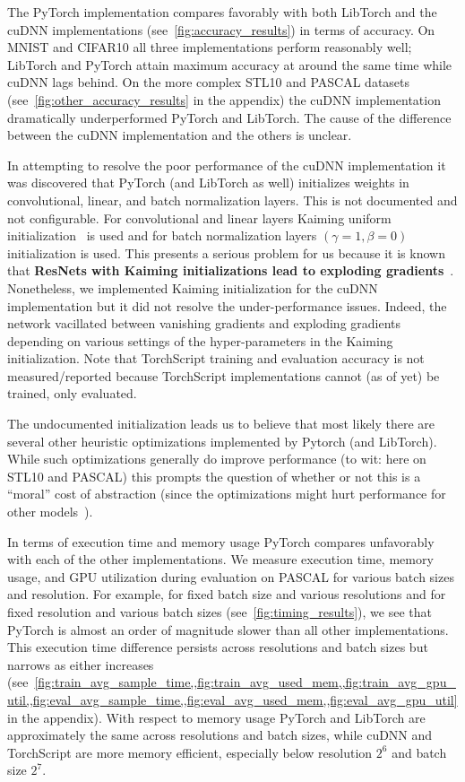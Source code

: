 

The PyTorch implementation compares favorably with both LibTorch and the cuDNN implementations (see~\cref{fig:accuracy_results}) in terms of accuracy.
On MNIST and CIFAR10 all three implementations perform reasonably well;
LibTorch and PyTorch attain maximum accuracy at around the same time while cuDNN lags behind.
On the more complex STL10 and PASCAL datasets (see~\cref{fig:other_accuracy_results} in the appendix) the cuDNN implementation dramatically underperformed PyTorch and LibTorch.
The cause of the difference between the cuDNN implementation and the others is unclear.

In attempting to resolve the poor performance of the cuDNN implementation it was discovered that PyTorch (and LibTorch as well) initializes weights in convolutional, linear, and batch normalization layers.
This is not documented and not configurable.
For convolutional and linear layers Kaiming uniform initialization~\cite{he2015delving} is used and for batch normalization layers $(\gamma=1,\beta=0)$ initialization is used.
This presents a serious problem for us because it is known that \textbf{ResNets with Kaiming initializations lead to exploding gradients}~\cite{zhang2019fixup}.
Nonetheless, we implemented Kaiming initialization for the cuDNN implementation but it did not resolve the under-performance issues.
Indeed, the network vacillated between vanishing gradients and exploding gradients depending on various settings of the hyper-parameters in the Kaiming initialization.
Note that TorchScript training and evaluation accuracy is not measured/reported because TorchScript implementations cannot (as of yet) be trained, only evaluated.

The undocumented initialization leads us to believe that most likely there are several other heuristic optimizations implemented by Pytorch (and LibTorch).
While such optimizations generally do improve performance (to wit: here on STL10 and PASCAL) this prompts the question of whether or not this is a ``moral'' cost of abstraction (since the optimizations might hurt performance for other models~\cite{zhang2019fixup}).



In terms of execution time and memory usage PyTorch compares unfavorably with each of the other implementations.
We measure execution time, memory usage, and GPU utilization during evaluation on PASCAL for various batch sizes and resolution.
For example, for fixed batch size and various resolutions and for fixed resolution and various batch sizes (see~\cref{fig:timing_results}), we see that PyTorch is almost an order of magnitude slower than all other implementations.
This execution time difference persists across resolutions and batch sizes but narrows as either increases (see~\cref{fig:train_avg_sample_time,,fig:train_avg_used_mem,,fig:train_avg_gpu_util,,fig:eval_avg_sample_time,,fig:eval_avg_used_mem,,fig:eval_avg_gpu_util} in the appendix).
With respect to memory usage PyTorch and LibTorch are approximately the same across resolutions and batch sizes, while cuDNN and TorchScript are more memory efficient, especially below resolution $2^6$ and batch size $2^7$.

